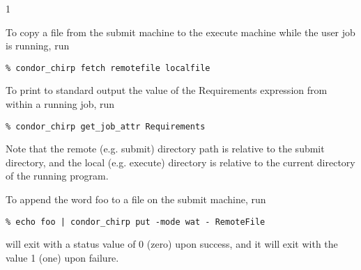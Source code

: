 \begin{ManPage}{\label{man-condor-chirp}}{1}
\Examples

To copy a file from the submit machine to the execute machine while the 
user job is running, run

\footnotesize
\begin{verbatim}
% condor_chirp fetch remotefile localfile
\end{verbatim}
\normalsize

To print to standard output the value of the Requirements expression from 
within a running job, run

\footnotesize
\begin{verbatim}
% condor_chirp get_job_attr Requirements
\end{verbatim}
\normalsize

Note that the remote (e.g. submit) directory path is relative to the
submit directory, and the local (e.g. execute) directory is relative to the
current directory of the running program.

To append the word foo to a file on the submit machine, run

\footnotesize
\begin{verbatim}
% echo foo | condor_chirp put -mode wat - RemoteFile
\end{verbatim}
\normalsize


\ExitStatus

 will exit with a status value of 0 (zero) upon success,
and it will exit with the value 1 (one) upon failure.

\end{ManPage}

